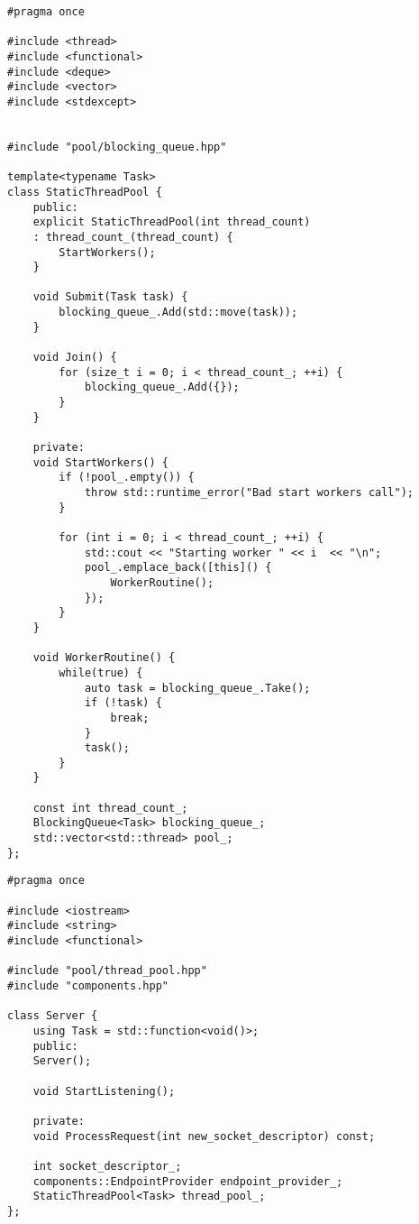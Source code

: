 \begin{lstlisting}[caption=Реализация пула потоков]
#pragma once

#include <thread>
#include <functional>
#include <deque>
#include <vector>
#include <stdexcept>


#include "pool/blocking_queue.hpp"

template<typename Task>
class StaticThreadPool {
	public:
	explicit StaticThreadPool(int thread_count)
	: thread_count_(thread_count) {
		StartWorkers();
	}
	
	void Submit(Task task) {
		blocking_queue_.Add(std::move(task));
	}
	
	void Join() {
		for (size_t i = 0; i < thread_count_; ++i) {
			blocking_queue_.Add({});
		}
	}
	
	private:
	void StartWorkers() {
		if (!pool_.empty()) {
			throw std::runtime_error("Bad start workers call");
		}
		
		for (int i = 0; i < thread_count_; ++i) {
			std::cout << "Starting worker " << i  << "\n";
			pool_.emplace_back([this]() {
				WorkerRoutine();
			});
		}
	}
	
	void WorkerRoutine() {
		while(true) {
			auto task = blocking_queue_.Take();
			if (!task) {
				break;
			}
			task();
		}
	}
	
	const int thread_count_;
	BlockingQueue<Task> blocking_queue_;
	std::vector<std::thread> pool_;
};

\end{lstlisting}

\begin{lstlisting}[caption=Реализация сервара из файла server/server.hpp]
#pragma once

#include <iostream>
#include <string>
#include <functional>

#include "pool/thread_pool.hpp"
#include "components.hpp"

class Server {
	using Task = std::function<void()>;
	public:
	Server();
	
	void StartListening();
	
	private:
	void ProcessRequest(int new_socket_descriptor) const;
	
	int socket_descriptor_;
	components::EndpointProvider endpoint_provider_;
	StaticThreadPool<Task> thread_pool_;
};

\end{lstlisting}

